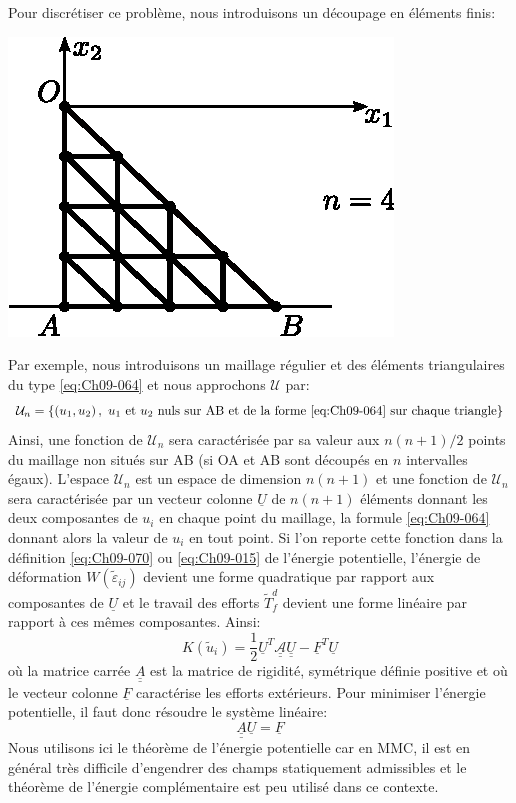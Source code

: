 Pour discrétiser ce problème, nous introduisons un découpage en éléments finis: 
\begin{center}
    \includegraphics{../images/T1_Ch09-07}
\end{center}
Par exemple, nous introduisons un maillage régulier et des éléments triangulaires du type \eqref{eq:Ch09-064} et nous approchons $\mathcal{U}$ par:
\[
\mathcal{U}_n = \left\{ \left( u_1, u_2 \right),\ u_1 \text{ et } u_2\ \text{nuls sur AB et de la forme~\eqref{eq:Ch09-064} sur chaque triangle} \right\}
\]
Ainsi, une fonction de $\mathcal{U}_n$ sera caractérisée par sa valeur aux $n(n+1)/2$ points du maillage non situés sur AB (si OA et AB sont découpés en $n$ intervalles égaux).
L'espace $\mathcal{U}_n$ est un espace de dimension $n(n+1)$ et une fonction de $\mathcal{U}_n$ sera caractérisée par un vecteur colonne $\underline{U}$ de $n(n+1)$ éléments donnant les deux composantes de $u_i$ en chaque point du maillage, la formule \eqref{eq:Ch09-064} donnant alors la valeur de $u_i$ en tout point.
Si l'on reporte cette fonction dans la définition \eqref{eq:Ch09-070} ou \eqref{eq:Ch09-015} de l'énergie potentielle, l'énergie de déformation $W\left( \tilde{\varepsilon}_{ij} \right)$ devient une forme quadratique par rapport aux composantes de $\underline{U}$ et le travail des efforts $\tilde{T}_f^d$ devient une forme linéaire par rapport à ces mêmes composantes.
Ainsi: 
\begin{equation}
    K \left( \tilde{u}_i \right) = \frac{1}{2} \underline{U}^T \underline{\underline{\mathcal{A}}} \underline{\underline{U}} - \underline{F}^T \underline{U}
    \label{eq:Ch09-071}
\end{equation}
où la matrice carrée $\underline{\underline{A}}$ est la matrice de rigidité, symétrique définie positive et où le vecteur colonne $\underline{F}$ caractérise les efforts extérieurs.
Pour minimiser l'énergie potentielle, il faut donc résoudre le système 
linéaire: 
\begin{equation}
    \underline{\underline{A}} \underline{U} = \underline{F}
    \label{eq:Ch09-072}
\end{equation}
Nous utilisons ici le théorème de l'énergie potentielle car en 
MMC, il est en général très difficile d'engendrer des champs statiquement admissibles et le théorème de l'énergie complémentaire est peu utilisé dans ce contexte. 
